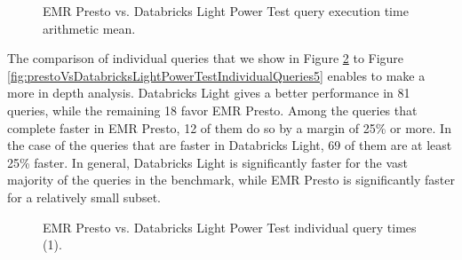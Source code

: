 \begin{figure}
   \begin{center}
   \end{center}
   \caption{EMR Presto vs. Databricks Light Power Test query execution time arithmetic mean.}
   \label{fig:prestoVsDatabricksLightPowerTestArithmeticMean}
\end{figure}

The comparison of individual queries that we show in Figure \ref{fig:prestoVsDatabricksLightPowerTestIndividualQueries1} to Figure \ref{fig:prestoVsDatabricksLightPowerTestIndividualQueries5} enables to make a more in depth analysis. Databricks Light gives a better performance in 81 queries, while the remaining 18 favor EMR Presto. Among the queries that complete faster in EMR Presto, 12 of them do so by a margin of 25\% or more. In the case of the queries that are faster in Databricks Light, 69 of them are at least 25\% faster. In general, Databricks Light is significantly faster for the vast majority of the queries in the benchmark, while EMR Presto is significantly faster for a relatively small subset.

\begin{figure}
   \begin{center}
   \end{center}
   \caption{EMR Presto vs. Databricks Light Power Test individual query times (1).}
   \label{fig:prestoVsDatabricksLightPowerTestIndividualQueries1}
\end{figure}

